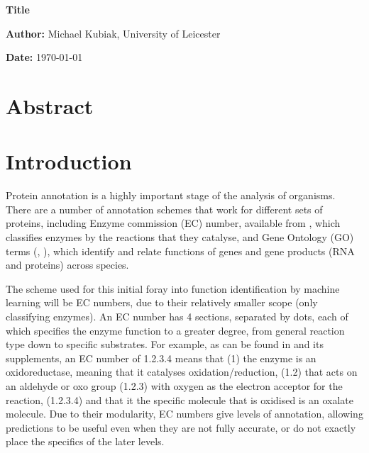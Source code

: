 \documentclass[12pt]{report}
\begin{document}
	\vspace*{\fill}
		\begin{center}
			\huge\textbf{Title}

			\vspace*{2cm}
			
			\large\textbf{Author:} Michael Kubiak, University of Leicester

			\vspace*{.5cm}

			\textbf{Date:} \today
			
		
		\end{center}
	\vspace*{\fill}

\pagebreak

	\section*{Abstract}
		
		
		
\pagebreak

	\tableofcontents

\pagebreak

	\section{Introduction}
		Protein annotation is a highly important stage of the analysis of organisms.  There are a number of annotation schemes that work for different sets of proteins, including Enzyme commission (EC) number, available from \cite{RefWorks:doc:5d80ae45e4b02466bec37c88}, which classifies enzymes by the reactions that they catalyse, and Gene Ontology (GO) terms (\cite{RefWorks:doc:5d80b66be4b07e3e85c92789}, \cite{RefWorks:doc:5d80b886e4b02466bec38715}), which identify and relate functions of genes and gene products (RNA and proteins) across species.  
		
		The scheme used for this initial foray into function identification by machine learning will be EC numbers, due to their relatively smaller scope (only classifying enzymes).  An EC number has 4 sections, separated by dots, each of which specifies the enzyme function to a greater degree, from general reaction type down to specific substrates. For example, as can be found in \cite{RefWorks:doc:5d70e98ce4b0ef464262611a} and its supplements, an EC number of 1.2.3.4 means that (1) the enzyme is an oxidoreductase, meaning that it catalyses oxidation/reduction, (1.2) that acts on an aldehyde or oxo group (1.2.3) with oxygen as the electron acceptor for the reaction, (1.2.3.4) and that it the specific molecule that is oxidised is an oxalate molecule.  Due to their modularity, EC numbers give levels of annotation, allowing predictions to be useful even when they are not fully accurate, or do not exactly place the specifics of the later levels.
		
\end{document}
